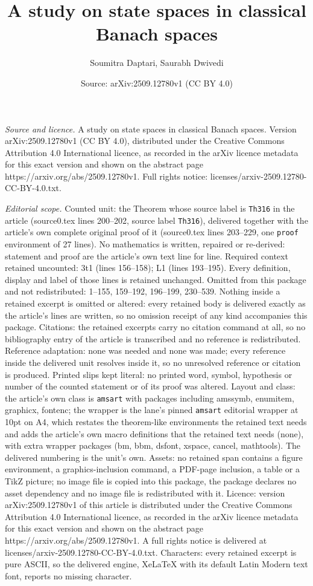 \documentclass[10pt,a4paper]{amsart}
\title[A study on state spaces in classical Banach spaces]{A study on state spaces in classical Banach spaces}
\author{Soumitra Daptari, Saurabh Dwivedi}
\date{Source: arXiv:2509.12780v1 (CC BY 4.0)}
\begin{document}
\maketitle

\noindent\emph{Source and licence.} A study on state spaces in classical Banach spaces. Version arXiv:2509.12780v1 (CC BY 4.0), distributed under the Creative Commons Attribution 4.0 International licence, as recorded in the arXiv licence metadata for this exact version and shown on the abstract page https://arxiv.org/abs/2509.12780v1. Full rights notice: licenses/arxiv-2509.12780-CC-BY-4.0.txt.\par\smallskip

\noindent\textit{Editorial scope.} Counted unit: the Theorem whose source label is \texttt{Th316} in the article (source0.tex lines 200--202, source label \texttt{Th316}), delivered together with the article's own complete original proof of it (source0.tex lines 203--229, one \texttt{proof} environment of 27 lines). No mathematics is written, repaired or re-derived: statement and proof are the article's own text line for line. Required context retained uncounted: 3t1 (lines 156--158); L1 (lines 193--195). Every definition, display and label of those lines is retained unchanged. Omitted from this package and not redistributed: 1--155, 159--192, 196--199, 230--539. Nothing inside a retained excerpt is omitted or altered: every retained body is delivered exactly as the article's lines are written, so no omission receipt of any kind accompanies this package. Citations: the retained excerpts carry no citation command at all, so no bibliography entry of the article is transcribed and no reference is redistributed. Reference adaptation: none was needed and none was made; every reference inside the delivered unit resolves inside it, so no unresolved reference or citation is produced. Printed slips kept literal: no printed word, symbol, hypothesis or number of the counted statement or of its proof was altered. Layout and class: the article's own class is \texttt{amsart} with packages including amssymb, enumitem, graphicx, fontenc; the wrapper is the lane's pinned \texttt{amsart} editorial wrapper at 10pt on A4, which restates the theorem-like environments the retained text needs and adds the article's own macro definitions that the retained text needs (none), with extra wrapper packages (bm, bbm, dsfont, xspace, cancel, mathtools). The delivered numbering is the unit's own. Assets: no retained span contains a figure environment, a graphics-inclusion command, a PDF-page inclusion, a table or a TikZ picture; no image file is copied into this package, the package declares no asset dependency and no image file is redistributed with it. Licence: version arXiv:2509.12780v1 of this article is distributed under the Creative Commons Attribution 4.0 International licence, as recorded in the arXiv licence metadata for this exact version and shown on the abstract page https://arxiv.org/abs/2509.12780v1. A full rights notice is delivered at licenses/arxiv-2509.12780-CC-BY-4.0.txt. Characters: every retained excerpt is pure ASCII, so the delivered engine, XeLaTeX with its default Latin Modern text font, reports no missing character.
\end{document}
